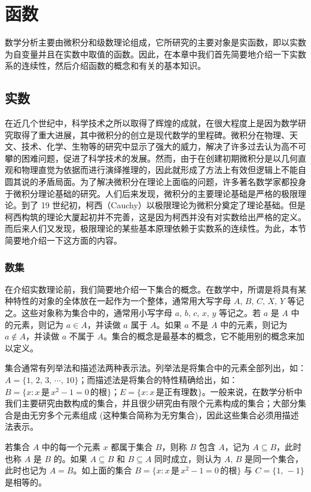 \documentclass[UTF8,12pt,a4paper,fontset=fandol]{ctexbook}
\begin{document}
\chapter{函数}
数学分析主要由微积分和级数理论组成，它所研究的主要对象是实函数，即以实数为自变量并且在实数中取值的函数。因此，在本章中我们首先简要地介绍一下实数系的连续性，然后介绍函数的概念和有关的基本知识。


\section{实数}
在近几个世纪中，科学技术之所以取得了辉煌的成就，在很大程度上是因为数学研究取得了重大进展，其中微积分的创立是现代数学的里程碑。微积分在物理、天文、技术、化学、生物等的研究中显示了强大的威力，解决了许多过去认为高不可攀的困难问题，促进了科学技术的发展。然而，由于在创建初期微积分是以几何直观和物理直觉为依据而进行演绎推理的，因此就形成了方法上有效但逻辑上不能自圆其说的矛盾局面。为了解决微积分在理论上面临的问题，许多著名数学家都投身于微积分理论基础的研究。人们后来发现，微积分的主要理论基础是严格的极限理论。到了 19 世纪初，柯西（Cauchy）以极限理论为微积分奠定了理论基础。但是柯西构筑的理论大厦起初并不完善，这是因为柯西并没有对实数给出严格的定义。而后来人们又发现，极限理论的某些基本原理依赖于实数系的连续性。为此，本节简要地介绍一下这方面的内容。


\subsection{数集}
在介绍实数理论前，我们简要地介绍一下集合的概念。在数学中，所谓是将具有某种特性的对象的全体放在一起作为一个整体，通常用大写字母 $A,\,B,\,C,\,X,\,Y$ 等记之。这些对象称为集合中的，通常用小写字母 $a,\,b,\,c,\,x,\,y$ 等记之。若 $a$ 是 $A$ 中的元素，则记为 $a\in A$，并读做 $a$ 属于 $A$。如果 $a$ 不是 $A$ 中的元素，则记为 $a\notin A$，并读做 $a$ 不属于 $A$。集合的概念是最基本的概念，它不能用别的概念来加以定义。


集合通常有列举法和描述法两种表示法。列举法是将集合中的元素全部列出，如：$A=\{1,\,2,\,3,\,\cdots,\,10\}$；而描述法是将集合的特性精确给出，如：$B=\{x:x\,\text{是}\,x^2-1=0\,\text{的根}\}$；$E=\{x:x\,\text{是正有理数}\}$。一般来说，在数学分析中我们主要研究由数构成的集合，并且很少研究由有限个元素构成的集合；大部分集合是由无穷多个元素组成 (这种集合简称为无穷集合)，因此这些集合必须用描述法表示。


若集合 $A$ 中的每一个元素 $x$ 都属于集合 $B$，则称 $B$ 包含 $A$，记为 $A \subseteq B$，此时也称 $A$ 是 $B$ 的。如果 $A \subseteq B$ 和 $B \subseteq A$ 同时成立，则认为 $A,\,B$ 是同一个集合，此时也记为 $A=B$。如上面的集合 $B=\{x:x\, \text{是}\, x^2-1=0\,\text{的根}\}$ 与 $C=\{1,\, -1\}$ 是相等的。
\end{document}
